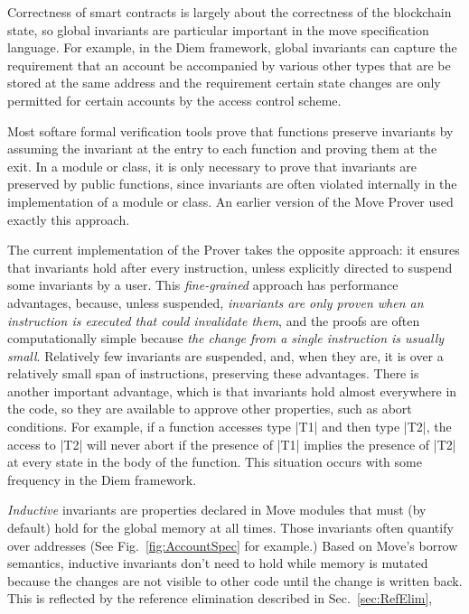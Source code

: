 Correctness of smart contracts is largely about the correctness of the
blockchain state, so global invariants are particular important in the
move specification language.  For example, in the Diem framework,
global invariants can capture the requirement that an account be
accompanied by various other types that are be stored at the same
address and the requirement certain state changes are only permitted
for certain accounts by the access control scheme.

Most softare formal verification tools prove that functions preserve
invariants by assuming the invariant at the entry to each function and
proving them at the exit.  In a module or class, it is only necessary
to prove that invariants are preserved by public functions, since
invariants are often violated internally in the implementation of a module or
class. An earlier version of the Move Prover used exactly this approach.

The current implementation of the Prover takes the opposite approach: it ensures
that invariants hold after every instruction, unless explicitly directed to
suspend some invariants by a user.  This \emph{fine-grained} approach has
performance advantages, because, unless suspended, \emph{invariants are only
  proven when an instruction is executed that could invalidate them}, and the
proofs are often computationally simple because \emph{the change from a single
  instruction is usually small}.  Relatively few invariants are suspended, and,
when they are, it is over a relatively small span of instructions, preserving
these advantages.  There is another important advantage, which is that
invariants hold almost everywhere in the code, so they are available to approve
other properties, such as abort conditions. For example, if a function accesses
type |T1| and then type |T2|, the access to |T2| will never abort if the
presence of |T1| implies the presence of |T2| at every state in the body of the
function.  This situation occurs with some frequency in the Diem framework.



\emph{Inductive} invariants are properties declared in Move modules that must
(by default) hold for the global memory at all times. Those invariants often
quantify over addresses (See Fig.~\ref{fig:AccountSpec} for example.) Based on
Move's borrow semantics, inductive invariants don't need to hold while memory is
mutated because the changes are not visible to other code until the change is written back.
This is reflected by the reference elimination described in
Sec.~\ref{sec:RefElim},

